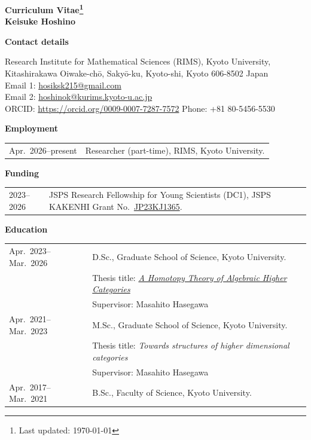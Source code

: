 \documentclass[a4paper,11pt,backend=luatex]{article} %
\newcommand*{\cvsection}[1]{%
  \Needspace{5\baselineskip}%
  \vspace{1.2\baselineskip}%
  {\raggedright          %
   \bfseries\large       %
   #1\par}               %
  \vspace{0.4\baselineskip}%
}
\begin{document}
\begin{center}\large\bfseries Curriculum Vitae\footnote{Last updated: \today}
\\
\rm Keisuke Hoshino
\end{center}
\noindent %
\cvsection{Contact details}
\noindent %
Research Institute for Mathematical Sciences (RIMS), Kyoto University,
\\
Kitashirakawa Oiwake-chō, Sakyō-ku, Kyoto-shi,
Kyoto 606-8502  
Japan
\\
Email 1: \href{mailto:hosiksk215@gmail.com}{hosiksk215@gmail.com}
\\
Email 2: \href{mailto:hoshinok@kurims.kyoto-u.ac.jp}{hoshinok@kurims.kyoto-u.ac.jp}
\\
ORCID: \href{https://orcid.org/0009-0007-7287-7572}{https://orcid.org/0009-0007-7287-7572}
\quad
Phone: +81 80-5456-5530


\cvsection{Employment}
\noindent\begin{tabularx}{\textwidth}{@{}lX@{}}
  Apr.\ 2026--present
  &
  Researcher (part-time), RIMS, Kyoto University.
\end{tabularx}


\cvsection{Funding}
\noindent\begin{tabularx}{\textwidth}{@{}lX@{}}
  2023--2026
  &
  JSPS Research Fellowship for Young Scientists (DC1), JSPS KAKENHI Grant No.\ \href{https://kaken.nii.ac.jp/grant/KAKENHI-PROJECT-23KJ1365/}{JP23KJ1365}.
\end{tabularx}

\cvsection{Education}
\noindent\begin{tabularx}{\textwidth}{@{}lX@{}}
  Apr.\ 2023--Mar.\ 2026
  &
  D.Sc., Graduate School of Science, Kyoto University.
  \vspace{-0.5em}
  \\&
  Thesis title: \href{https://doi.org/10.14989/doctor.k26476}{\textit{A Homotopy Theory of Algebraic Higher Categories}}
  \\&
  Supervisor: {Masahito Hasegawa}
  \\
  Apr.\ 2021--Mar.\ 2023
  &
  M.Sc., Graduate School of Science, Kyoto University.
  \vspace{-0.5em}
  \\&
  Thesis title: \textit{Towards structures of higher dimensional categories}
  \\&
  Supervisor: {Masahito Hasegawa}
  \\
  Apr.\ 2017--Mar.\ 2021
  &
  B.Sc., Faculty of Science, Kyoto University.
\end{tabularx}
\end{document}
